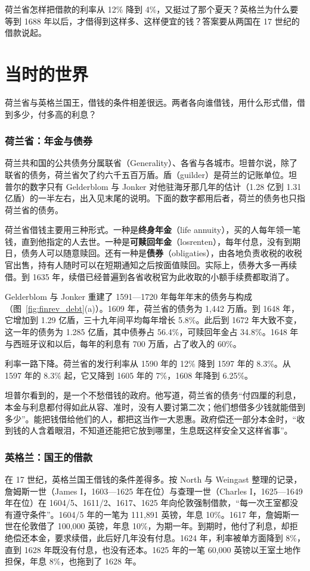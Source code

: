 荷兰省怎样把借款的利率从 12\% 降到 4\%，又挺过了那个夏天？英格兰为什么要等到 1688 年以后，才借得到这样多、这样便宜的钱？答案要从两国在 17 世纪的借款说起。

\section{当时的世界}\label{sec:finrev-world}

荷兰省与英格兰国王，借钱的条件相差很远。两者各向谁借钱，用什么形式借，借到多少，付多高的利息？

\subsubsection{荷兰省：年金与债券}
荷兰共和国的公共债务分属联省（Generality）、各省与各城市。坦普尔说，除了联省的债务，荷兰省欠了约六千五百万盾\cite{temple1673}。盾（guilder）是荷兰的记账单位。坦普尔的数字只有 Gelderblom 与 Jonker 对他驻海牙那几年的估计（1.28 亿到 1.31 亿盾）的一半左右，出入见末尾的说明。下面的数字都用后者，荷兰的债务也只指荷兰省的债务。

荷兰省借钱主要用三种形式。一种是\textbf{终身年金}（life annuity），买的人每年领一笔钱，直到他指定的人去世。一种是\textbf{可赎回年金}（losrenten），每年付息，没有到期日，债务人可以随意赎回\cite{gj2011}。还有一种是\textbf{债券}（obligaties），由各地负责收税的收税官出售，持有人随时可以在短期通知之后按面值赎回。实际上，债券大多一再续借。到 1635 年，续借已经普遍到各省收税官为此收取的小额手续费都取消了\cite{gj2011}。

Gelderblom 与 Jonker 重建了 1591—1720 年每年年末的债务与构成（图~\ref{fig:finrev_debt}(a)）。1609 年，荷兰省的债务为 1,442 万盾。到 1648 年，它增加到 1.29 亿盾，三十九年间平均每年增长 5.8\%。此后到 1672 年大致不变，这一年的债务为 1.285 亿盾，其中债券占 56.4\%，可赎回年金占 34.8\%\cite{gj2011}。1648 年与西班牙议和以后，每年的利息有 700 万盾，占了收入的 60\%\cite{gj2011}。

利率一路下降。荷兰省的发行利率从 1590 年的 12\% 降到 1597 年的 8.3\%。从 1597 年的 8.3\% 起，它又降到 1605 年的 7\%，1608 年降到 6.25\%\cite{gj2011}。

坦普尔看到的，是一个不愁借钱的政府。他写道，荷兰省的债务“付四厘的利息，本金与利息都付得如此从容、准时，没有人要讨第二次；他们想借多少钱就能借到多少”。能把钱借给他们的人，都把这当作一大恩惠。政府偿还一部分本金时，“收到钱的人含着眼泪，不知道还能把它放到哪里，生息既这样安全又这样省事”\cite{temple1673}。

\subsubsection{英格兰：国王的借款}
在 17 世纪，英格兰国王借钱的条件差得多。按 North 与 Weingast 整理的记录，詹姆斯一世（James I，1603—1625 年在位）与查理一世（Charles I，1625—1649 年在位）在 1604/5、1611/2、1617、1625 年向伦敦强制借款，“每一次王室都没有遵守条件”。1604/5 年的一笔为 111,891 英镑，年息 10\%。1617 年，詹姆斯一世在伦敦借了 100,000 英镑，年息 10\%，为期一年。到期时，他付了利息，却拒绝偿还本金，要求续借，此后好几年没有付息。1624 年，利率被单方面降到 8\%，直到 1628 年既没有付息，也没有还本。1625 年的一笔 60,000 英镑以王室土地作担保，年息 8\%，也拖到了 1628 年\cite{nw1989}。

